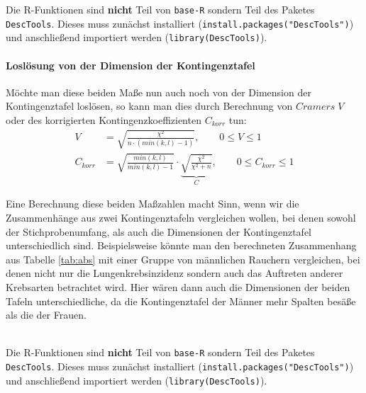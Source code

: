 \documentclass[a4paper]{article}
\newcommand\dangersign{%
 \makebox[1.8em][c]{%
 \makebox[0pt][c]{\raisebox{.15em}{\small!}}%
 \makebox[0pt][c]{\color{red}\Large$\triangle$}}}%
\begin{document}
\noindent \dangersign Die R-Funktionen sind \textbf{nicht} Teil von \texttt{base-R} sondern Teil des Paketes \texttt{DescTools}. Dieses muss zunächst installiert (\texttt{install.packages("DescTools")}) und anschließend importiert werden (\texttt{library(DescTools)}).

\paragraph{Loslösung von der Dimension der Kontingenztafel}
Möchte man diese beiden Maße nun auch noch von der Dimension der Kontingenztafel loslösen, so kann man dies durch Berechnung von $Cramers\; V$ oder des korrigierten Kontingenzkoeffizienten $C_{korr}$ tun:
\begin{align*}
    V &= \sqrt{\frac{\chi^2}{n\cdot(min(k,l)-1)}}, \qquad 0 \leq V \leq 1\\
    C_{korr} &= \sqrt{\frac{min(k,l)}{min(k,l)-1}}\cdot\underbrace{\sqrt{\frac{\chi^2}{\chi^2 + n}}}_{C}, \qquad 0 \leq C_{korr} \leq 1
\end{align*}

\noindent Eine Berechnung diese beiden Maßzahlen macht Sinn, wenn wir die Zusammenhänge aus zwei Kontingenztafeln vergleichen wollen, bei denen sowohl der Stichprobenumfang, als auch die Dimensionen der Kontingenztafel unterschiedlich sind. Beispielsweise könnte man den berechneten Zusammenhang aus Tabelle \ref{tab:abs} mit einer Gruppe von männlichen Rauchern vergleichen, bei denen nicht nur die Lungenkrebsinzidenz sondern auch das Auftreten anderer Krebsarten betrachtet wird. Hier wären dann auch die Dimensionen der beiden Tafeln unterschiedliche, da die Kontingenztafel der Männer mehr Spalten besäße als die der Frauen.\\

\noindent  {}\\
\noindent  {}

\noindent \dangersign Die R-Funktionen sind \textbf{nicht} Teil von \texttt{base-R} sondern Teil des Paketes \texttt{DescTools}. Dieses muss zunächst installiert (\texttt{install.packages("DescTools")}) und anschließend importiert werden (\texttt{library(DescTools)}).
\end{document}
